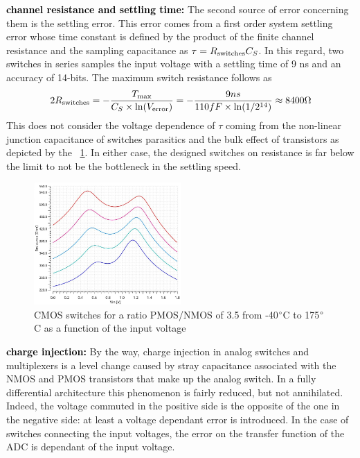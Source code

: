 \textbf{\textcolor{black}{channel resistance and settling time:}}
The second source of error concerning them is the settling error. This error comes from a first order system settling error whose time constant is defined by the product of the finite channel resistance and the sampling capacitance as \(\tau = R_{\rm switches}C_S \). In this regard, two switches in series samples the input voltage with a settling time of 9 ns and an accuracy of 14-bits. The maximum switch resistance follows as 
\begin{equation}
2 R_{\rm switches} = -\frac{T_{\max}}{C_S \times \ln(V_{\rm error})} = - \frac{9 ns}{110 fF \times \ln (1/2^{14})} \approx 8400 \Omega
\end{equation}
This does not consider the voltage dependence of \(\tau \) coming from the non-linear junction capacitance of switches parasitics and the bulk effect of transistors as depicted by the \figurename~\ref{fig:cmos-ron-vin-temp}. In either case, the designed switches on resistance is far below the limit to not be the bottleneck in the settling speed.
\begin{figure}[htp]
	\centering
	\includegraphics[width=0.5\textwidth]{Chapter4/Figs/xt018_2u_180nm_3-5_resistance.jpg}
	\caption{CMOS switches for a ratio PMOS/NMOS of 3.5 from -40$\degree$C to 175$\degree$C as a function of the input voltage}
	\label{fig:cmos-ron-vin-temp}
\end{figure}

\textbf{\textcolor{black}{charge injection:}}
By the way, charge injection in analog switches and multiplexers is a level change caused by stray capacitance associated with the NMOS and PMOS transistors that make up the analog switch. In a fully differential architecture this phenomenon is fairly reduced, but not annihilated. Indeed, the voltage commuted in the positive side is the opposite of the one in the negative side: at least a voltage dependant error is introduced. In the case of switches connecting the input voltages, the error on the transfer function of the ADC is dependant of the input voltage.

